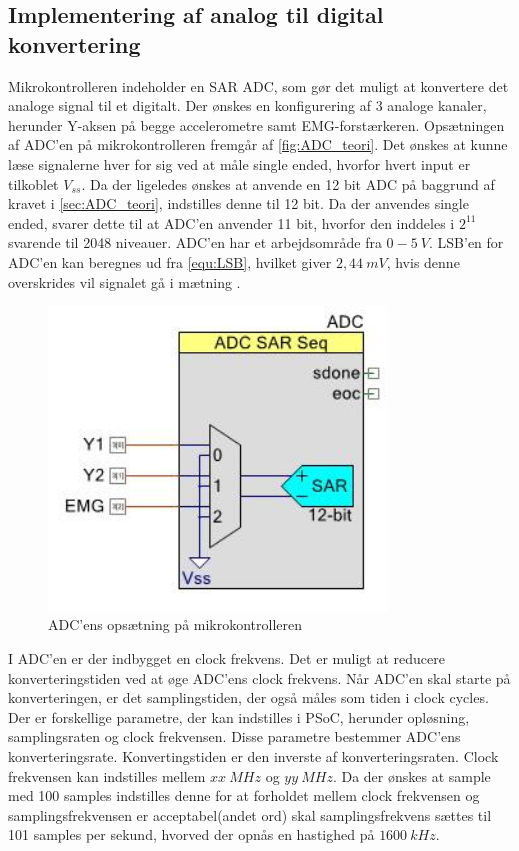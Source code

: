 \subsection{Implementering af analog til digital konvertering}
Mikrokontrolleren indeholder en SAR ADC, som gør det muligt at konvertere det analoge signal til et digitalt. Der ønskes en konfigurering af 3 analoge kanaler, herunder Y-aksen på begge accelerometre samt EMG-forstærkeren. Opsætningen af ADC'en på mikrokontrolleren fremgår af \autoref{fig:ADC_teori}. Det ønskes at kunne læse signalerne hver for sig ved at måle single ended, hvorfor hvert input er tilkoblet $V_{ss}$. Da der ligeledes ønskes at anvende en 12 bit ADC på baggrund af kravet i \autoref{sec:ADC_teori}, indstilles denne til 12 bit. Da der anvendes single ended, svarer dette til at ADC'en anvender 11 bit, hvorfor den inddeles i $2^{11}$ svarende til 2048 niveauer. ADC'en har et arbejdsområde fra $0-5~V$. LSB'en for ADC'en kan beregnes ud fra \autoref{equ:LSB}, hvilket giver $2,44~mV$, hvis denne overskrides vil signalet gå i mætning \citep{ADC2014}. 

\begin{figure}[H]
\centering
\includegraphics[width=0.8\textwidth]{figures/implementering/ADC_imp.jpeg}
\caption{ADC'ens opsætning på mikrokontrolleren}
\label{fig:ADC_teori}
\end{figure}

I ADC'en er der indbygget en clock frekvens. Det er muligt at reducere konverteringstiden ved at øge ADC'ens clock frekvens. Når ADC'en skal starte på konverteringen, er det samplingstiden, der også måles som tiden i clock cycles. Der er forskellige parametre, der kan indstilles i PSoC, herunder opløsning, samplingsraten og clock frekvensen. Disse parametre bestemmer ADC'ens konverteringsrate. Konvertingstiden er den inverste af konverteringsraten. Clock frekvensen kan indstilles mellem $xx~MHz$ og $yy~MHz$.\citep{cypresspsoc42014} Da der ønskes at sample med 100 samples indstilles denne for at forholdet mellem clock frekvensen og samplingsfrekvensen er acceptabel(andet ord) skal samplingsfrekvens sættes til 101 samples per sekund, hvorved der opnås en hastighed på $1600~kHz$.
 